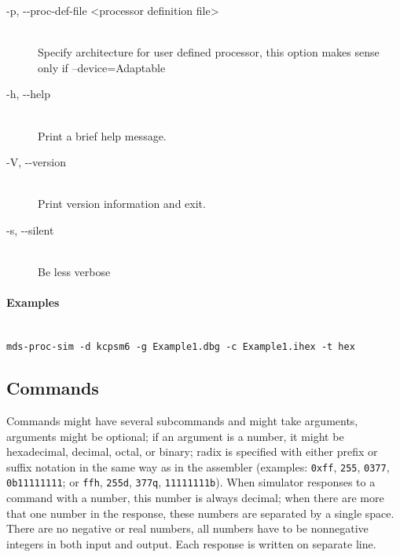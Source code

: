 \begin{description}
                \item[-p, -{}-proc-def-file <processor definition file>]~\\
                    Specify architecture for user defined processor, this option makes sense only if --device=Adaptable

                \item[-h, -{}-help]~\\
                    Print a brief help message.

                \item[-V, -{}-version]~\\
                    Print version information and exit.

                \item[-s, -{}-silent]~\\
                    Be less verbose
            \end{description}

        \paragraph{Examples}~\\
            \verb'mds-proc-sim -d kcpsm6 -g Example1.dbg -c Example1.ihex -t hex'

    \subsection{Commands}
        Commands might have several subcommands and might take arguments, arguments might be optional; if an argument is a number, it might be hexadecimal, decimal, octal, or binary; radix is specified with either prefix or suffix notation in the same way as in the assembler (examples: \texttt{0xff}, \texttt{255}, \texttt{0377}, \texttt{0b11111111}; or \texttt{ffh}, \texttt{255d}, \texttt{377q}, \texttt{11111111b}). When simulator responses to a command with a number, this number is always decimal; when there are more that one number in the response, these numbers are separated by a single space. There are no negative or real numbers, all numbers have to be nonnegative integers in both input and output. Each response is written on separate line.

